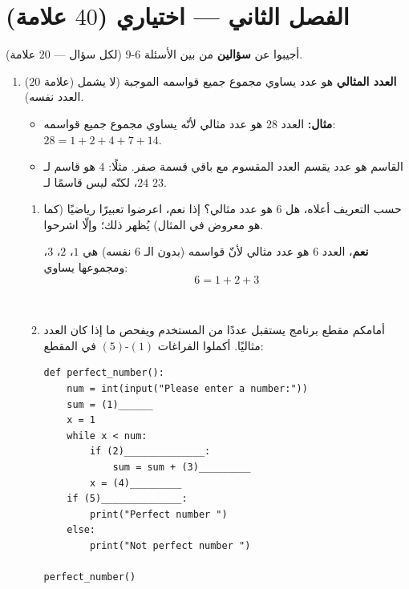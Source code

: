 \documentclass[14pt]{extarticle}
\begin{document}
\clearpage
\section*{الفصل الثاني — اختياري ($40$ علامة)}
أجيبوا عن \textbf{سؤالين} من بين الأسئلة $6$-$9$ (لكل سؤال — $20$ علامة).

\begin{enumerate}[resume, label=\textbf{السؤال \arabic*:}, wide=0pt, itemsep=2.2em]

\item ($20$ علامة) \textbf{العدد المثالي} هو عدد يساوي مجموع جميع قواسمه الموجبة (لا يشمل العدد نفسه).
\begin{itemize}
\item \textbf{مثال:} العدد $28$ هو عدد مثالي لأنّه يساوي مجموع جميع قواسمه: $28 = 1 + 2 + 4 + 7 + 14$.
\item القاسم هو عدد يقسم العدد المقسوم مع باقي قسمة صفر. مثلًا: $4$ هو قاسم لـ $24$، لكنّه ليس قاسمًا لـ $23$.
\end{itemize}

\begin{enumerate}[label=\alph*.]
\item حسب التعريف أعلاه، هل $6$ هو عدد مثالي؟ إذا نعم، اعرضوا تعبيرًا رياضيًا (كما هو معروض في المثال) يُظهر ذلك؛ وإلّا اشرحوا.
\ifwithsols
\begin{boxSolution}
\textbf{نعم}، العدد $6$ هو عدد مثالي لأنّ قواسمه (بدون الـ $6$ نفسه) هي $1$، $2$، $3$، ومجموعها يساوي:
$$6 = 1 + 2 + 3$$
\end{boxSolution}
\else
\\ \underline{\hspace{14cm}}
\fi
\filbreak

\item أمامكم مقطع برنامج يستقبل عددًا من المستخدم ويفحص ما إذا كان العدد مثاليًا. أكملوا الفراغات $(1)$-$(5)$ في المقطع:

\begin{boxCode}
\begin{english}
\begin{verbatim}
def perfect_number():
    num = int(input("Please enter a number:"))
    sum = (1)______
    x = 1
    while x < num:
        if (2)______________:
            sum = sum + (3)_________
        x = (4)_________
    if (5)______________:
        print("Perfect number ")
    else:
        print("Not perfect number ")

perfect_number()
\end{verbatim}
\end{english}
\end{boxCode}


\end{enumerate}
\end{enumerate}
\end{document}
